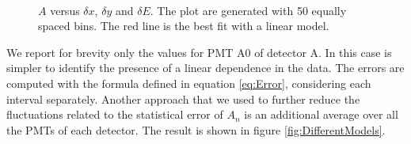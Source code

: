 \begin{figure}[!hbtp]
\centering
{}
\\
\caption{ $A$ versus $\delta x$, $\delta y$ and $\delta E$. The plot are generated with 50 equally spaced bins. The red line is the best fit with a linear model.}
\end{figure} 

We report for brevity only the values for PMT A0 of detector A. In this case is simpler to identify the presence of a linear dependence in the data. The errors are computed with the formula defined in equation \ref{eq:Error}, considering each interval separately.
Another approach that we used to further reduce the fluctuations related to the statistical error of $A_{n}$ is an additional average over all the PMTs of each detector. The result is shown in figure \ref{fig:DifferentModels}.

